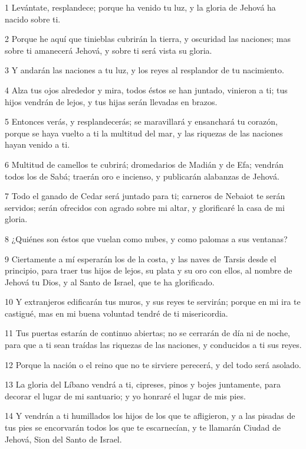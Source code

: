 \par 1 Levántate, resplandece; porque ha venido tu luz, y la gloria de Jehová ha nacido sobre ti.
\par 2 Porque he aquí que tinieblas cubrirán la tierra, y oscuridad las naciones; mas sobre ti amanecerá Jehová, y sobre ti será vista su gloria.
\par 3 Y andarán las naciones a tu luz, y los reyes al resplandor de tu nacimiento.
\par 4 Alza tus ojos alrededor y mira, todos éstos se han juntado, vinieron a ti; tus hijos vendrán de lejos, y tus hijas serán llevadas en brazos.
\par 5 Entonces verás, y resplandecerás; se maravillará y ensanchará tu corazón, porque se haya vuelto a ti la multitud del mar, y las riquezas de las naciones hayan venido a ti.
\par 6 Multitud de camellos te cubrirá; dromedarios de Madián y de Efa; vendrán todos los de Sabá; traerán oro e incienso, y publicarán alabanzas de Jehová.
\par 7 Todo el ganado de Cedar será juntado para ti; carneros de Nebaiot te serán servidos; serán ofrecidos con agrado sobre mi altar, y glorificaré la casa de mi gloria.
\par 8 ¿Quiénes son éstos que vuelan como nubes, y como palomas a sus ventanas?
\par 9 Ciertamente a mí esperarán los de la costa, y las naves de Tarsis desde el principio, para traer tus hijos de lejos, su plata y su oro con ellos, al nombre de Jehová tu Dios, y al Santo de Israel, que te ha glorificado.
\par 10 Y extranjeros edificarán tus muros, y sus reyes te servirán; porque en mi ira te castigué, mas en mi buena voluntad tendré de ti misericordia.
\par 11 Tus puertas estarán de continuo abiertas; no se cerrarán de día ni de noche, para que a ti sean traídas las riquezas de las naciones, y conducidos a ti sus reyes.
\par 12 Porque la nación o el reino que no te sirviere perecerá, y del todo será asolado. 
\par 13 La gloria del Líbano vendrá a ti, cipreses, pinos y bojes juntamente, para decorar el lugar de mi santuario; y yo honraré el lugar de mis pies.
\par 14 Y vendrán a ti humillados los hijos de los que te afligieron, y a las pisadas de tus pies se encorvarán todos los que te escarnecían, y te llamarán Ciudad de Jehová, Sion del Santo de Israel.
